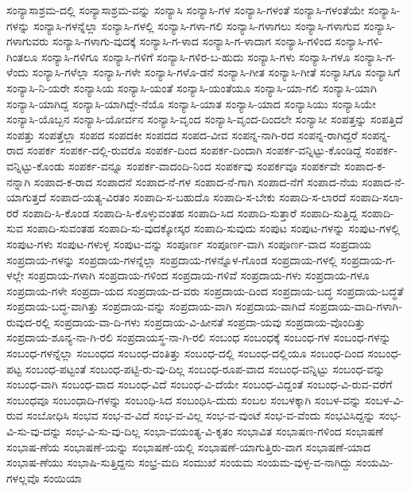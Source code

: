 {ಸಂನ್ಯಾಸಾಶ್ರಮ-ದಲ್ಲಿ
ಸಂನ್ಯಾಸಾಶ್ರಮ-ವನ್ನು
ಸಂನ್ಯಾಸಿ
ಸಂನ್ಯಾಸಿ-ಗಳ
ಸಂನ್ಯಾಸಿ-ಗಳಂತೆ
ಸಂನ್ಯಾಸಿ-ಗಳಂತೆಯೇ
ಸಂನ್ಯಾಸಿ-ಗಳನ್ನು
ಸಂನ್ಯಾಸಿ-ಗಳನ್ನೆಲ್ಲಾ
ಸಂನ್ಯಾಸಿ-ಗಳಲ್ಲಿ
ಸಂನ್ಯಾಸಿ-ಗಳಾ-ಗಲಿ
ಸಂನ್ಯಾಸಿ-ಗಳಾಗಲು
ಸಂನ್ಯಾಸಿ-ಗಳಾಗುವ
ಸಂನ್ಯಾಸಿ-ಗಳಾಗುವರು
ಸಂನ್ಯಾಸಿ-ಗಳಾಗು-ವುದಕ್ಕೆ
ಸಂನ್ಯಾಸಿ-ಗ-ಳಾದ
ಸಂನ್ಯಾಸಿ-ಗ-ಳಾದಾಗ
ಸಂನ್ಯಾಸಿ-ಗಳಿಂದ
ಸಂನ್ಯಾಸಿ-ಗಳಿ-ಗಿಂತಲೂ
ಸಂನ್ಯಾಸಿ-ಗಳಿಗೂ
ಸಂನ್ಯಾಸಿ-ಗಳಿಗೆ
ಸಂನ್ಯಾಸಿ-ಗಳಿರ-ಬ-ಹುದು
ಸಂನ್ಯಾಸಿ-ಗಳು
ಸಂನ್ಯಾಸಿ-ಗಳೂ
ಸಂನ್ಯಾಸಿ-ಗ-ಳೆಂದು
ಸಂನ್ಯಾಸಿ-ಗಳೆಲ್ಲಾ
ಸಂನ್ಯಾಸಿ-ಗಳೇ
ಸಂನ್ಯಾಸಿ-ಗಳೊ-ಡನೆ
ಸಂನ್ಯಾಸಿ-ಗೀತ
ಸಂನ್ಯಾಸಿ-ಗೀತೆ
ಸಂನ್ಯಾಸಿಗೂ
ಸಂನ್ಯಾಸಿಗೆ
ಸಂನ್ಯಾಸಿ-ನಿ-ಯರೇ
ಸಂನ್ಯಾಸಿಯ
ಸಂನ್ಯಾಸಿ-ಯಂತೆ
ಸಂನ್ಯಾಸಿ-ಯಂತೆಯೂ
ಸಂನ್ಯಾಸಿ-ಯಾ-ಗಲಿ
ಸಂನ್ಯಾಸಿ-ಯಾಗಿ
ಸಂನ್ಯಾಸಿ-ಯಾಗಿದ್ದ
ಸಂನ್ಯಾಸಿ-ಯಾಗಿದ್ದೇ-ನೆಯೊ
ಸಂನ್ಯಾಸಿ-ಯಾತ
ಸಂನ್ಯಾಸಿ-ಯಾದ
ಸಂನ್ಯಾಸಿಯು
ಸಂನ್ಯಾಸಿಯೇ
ಸಂನ್ಯಾಸಿ-ಯೊಬ್ಬನ
ಸಂನ್ಯಾಸಿ-ಯೋರ್ವನ
ಸಂನ್ಯಾಸಿ-ವೃಂದ
ಸಂನ್ಯಾಸಿ-ವೃಂದ-ದಿಂದಲೇ
ಸಂನ್ಯಾಸೀ
ಸಂಪತ್ತನ್ನು
ಸಂಪತ್ತಿದೆ
ಸಂಪತ್ತು
ಸಂಪತ್ತೆಲ್ಲಾ
ಸಂಪದ
ಸಂಪದಕೀ
ಸಂಪದದ
ಸಂಪದ-ವೀವ
ಸಂಪನ್ನ-ನಾಗಿ-ರದ
ಸಂಪನ್ನ-ರಾಗಿದ್ದರೆ
ಸಂಪನ್ನ-ರಾದ
ಸಂಪರ್ಕ
ಸಂಪರ್ಕ-ದಲ್ಲಿ-ರುವರೊ
ಸಂಪರ್ಕ-ದಿಂದ
ಸಂಪರ್ಕ-ದಿಂದಾಗಿ
ಸಂಪರ್ಕ-ವನ್ನಿಟ್ಟು-ಕೊಂಡಿದ್ದೆ
ಸಂಪರ್ಕ-ವನ್ನಿಟ್ಟು-ಕೊಂಡು
ಸಂಪರ್ಕ-ವನ್ನೂ
ಸಂಪರ್ಕ-ವಾದಂದಿ-ನಿಂದ
ಸಂಪರ್ಕವು
ಸಂಪರ್ಕವೂ
ಸಂಪರ್ಕವೇ
ಸಂಪಾದ-ಕ-ನನ್ನಾಗಿ
ಸಂಪಾದ-ಕ-ರಾದ
ಸಂಪಾದನೆ
ಸಂಪಾದ-ನೆ-ಗಳ
ಸಂಪಾದ-ನೆ-ಗಾಗಿ
ಸಂಪಾದ-ನೆಗೆ
ಸಂಪಾದ-ನೆಯ
ಸಂಪಾದ-ನೆ-ಯಾಗುತ್ತದೆ
ಸಂಪಾದ-ಯತ್ಯ-ವಿರತಂ
ಸಂಪಾದಿ-ಸ-ಬಹುದೊ
ಸಂಪಾದಿ-ಸ-ಬೇಕು
ಸಂಪಾದಿ-ಸ-ಲಾರದೆ
ಸಂಪಾದಿ-ಸಲಾ-ರರೆ
ಸಂಪಾದಿ-ಸಿ-ಕೊಂಡ
ಸಂಪಾದಿ-ಸಿ-ಕೊಳ್ಳುವಂತಹ
ಸಂಪಾದಿ-ಸಿದ
ಸಂಪಾದಿ-ಸುತ್ತಾರೆ
ಸಂಪಾದಿ-ಸುತ್ತಿದ್ದ
ಸಂಪಾದಿ-ಸುವ
ಸಂಪಾದಿ-ಸುವಂತಹ
ಸಂಪಾದಿ-ಸು-ವುದಕ್ಕೋಸ್ಕರ
ಸಂಪಾದಿ-ಸುವುದು
ಸಂಪುಟ
ಸಂಪುಟ-ಗಳನ್ನು
ಸಂಪುಟ-ಗಳಲ್ಲಿ
ಸಂಪುಟ-ಗಳು
ಸಂಪುಟ-ಗಳುಳ್ಳ
ಸಂಪುಟ-ವನ್ನು
ಸಂಪೂರ್ಣ
ಸಂಪೂರ್ಣ-ವಾಗಿ
ಸಂಪೂರ್ಣ-ವಾದ
ಸಂಪ್ರದಾಯ
ಸಂಪ್ರದಾಯ-ಗಳನ್ನು
ಸಂಪ್ರದಾಯ-ಗಳನ್ನೆಲ್ಲಾ
ಸಂಪ್ರದಾಯ-ಗಳನ್ನೊಳ-ಗೊಂಡ
ಸಂಪ್ರದಾಯ-ಗಳಲ್ಲಿ
ಸಂಪ್ರದಾಯ-ಗ-ಳಲ್ಲೇ
ಸಂಪ್ರದಾಯ-ಗಳಾಗಿ
ಸಂಪ್ರದಾಯ-ಗಳಿಂದ
ಸಂಪ್ರದಾಯ-ಗಳಿವೆ
ಸಂಪ್ರದಾಯ-ಗಳು
ಸಂಪ್ರದಾಯ-ಗಳೂ
ಸಂಪ್ರದಾಯ-ಗಳೇ
ಸಂಪ್ರದಾ-ಯದ
ಸಂಪ್ರದಾಯ-ದ-ವರು
ಸಂಪ್ರದಾಯ-ದಿಂದ
ಸಂಪ್ರದಾಯ-ಬದ್ಧ
ಸಂಪ್ರದಾಯ-ಬದ್ಧತೆ
ಸಂಪ್ರದಾಯ-ಬದ್ಧ-ವಾಗಿತ್ತು
ಸಂಪ್ರದಾಯ-ವನ್ನು
ಸಂಪ್ರದಾಯ-ವಾಗಿ
ಸಂಪ್ರದಾಯ-ವಾಗಿದೆ
ಸಂಪ್ರದಾಯ-ವಾದಿ-ಗಳಾಗಿ-ರುವುದ-ರಲ್ಲಿ
ಸಂಪ್ರದಾಯ-ವಾ-ದಿ-ಗಳು
ಸಂಪ್ರದಾಯ-ವಿ-ಹೀನತೆ
ಸಂಪ್ರದಾ-ಯವು
ಸಂಪ್ರದಾಯ-ವೊಂದಿತ್ತು
ಸಂಪ್ರದಾಯ-ಶೂನ್ಯ-ನಾ-ಗಿ-ರಲಿ
ಸಂಪ್ರದಾಯಸ್ಥ-ನಾ-ಗಿ-ರಲಿ
ಸಂಬಂಧ
ಸಂಬಂಧಕ್ಕೆ
ಸಂಬಂಧ-ಗಳ
ಸಂಬಂಧ-ಗಳನ್ನು
ಸಂಬಂಧ-ಗಳನ್ನೆಲ್ಲಾ
ಸಂಬಂಧದ
ಸಂಬಂಧ-ದಂತಿತ್ತು
ಸಂಬಂಧ-ದಲ್ಲಿ
ಸಂಬಂಧ-ದಲ್ಲಿಯೂ
ಸಂಬಂಧ-ದಿಂದ
ಸಂಬಂಧ-ಪಟ್ಟ
ಸಂಬಂಧ-ಪಟ್ಟಂತೆ
ಸಂಬಂಧ-ಪಟ್ಟಿ-ರು-ವು-ದಿಲ್ಲ
ಸಂಬಂಧ-ರೂಪ-ವಾದ
ಸಂಬಂಧ-ವನ್ನಿಟ್ಟು
ಸಂಬಂಧ-ವನ್ನು
ಸಂಬಂಧ-ವಾಗಿ
ಸಂಬಂಧ-ವಾದ
ಸಂಬಂಧ-ವಿದೆ
ಸಂಬಂಧ-ವಿ-ದೆಯೇ
ಸಂಬಂಧ-ವಿದ್ದಂತೆ
ಸಂಬಂಧ-ವಿ-ರುವ-ವರೆಗೆ
ಸಂಬಂಧವೂ
ಸಂಬಂಧಾದಿ-ಗಳನ್ನು
ಸಂಬಂಧಿ-ಸಿದ
ಸಂಬಂಧಿಸಿ-ದುದು
ಸಂಬಲ
ಸಂಬಳಕ್ಕಾಗಿ
ಸಂಬಳ-ವನ್ನು
ಸಂಬಳ-ವಿ-ರುವ
ಸಂಬೋಧಿಸಿ
ಸಂಭವ
ಸಂಭ-ವ-ವಿದೆ
ಸಂಭ-ವ-ವಿಲ್ಲ
ಸಂಭ-ವ-ವುಂಟೆ
ಸಂಭ-ವ-ವೆಂದು
ಸಂಭವಿಸಿದ್ದನ್ನು
ಸಂಭ-ವಿ-ಸು-ವು-ದನ್ನು
ಸಂಭ-ವಿ-ಸು-ವು-ದಿಲ್ಲ
ಸಂಭಾ-ವಯಂತ್ಯ-ವಿ-ಕೃತಂ
ಸಂಭಾವಿತ
ಸಂಭಾಷಣ-ಗಳಿಂದ
ಸಂಭಾಷಣೆ
ಸಂಭಾಷ-ಣೆಯ
ಸಂಭಾಷಣೆ-ಯನ್ನು
ಸಂಭಾಷಣೆ-ಯಲ್ಲಿ
ಸಂಭಾಷಣೆ-ಯಾಗುತ್ತಿರು-ವಾಗ
ಸಂಭಾಷಣೆ-ಯಾದ
ಸಂಭಾಷ-ಣೆಯು
ಸಂಭಾಷಿ-ಸುತ್ತಿದ್ದನು
ಸಂಭ್ರ-ಮದಿ
ಸಂಮುಖೆ
ಸಂಯಮ
ಸಂಯಮ-ವುಳ್ಳ-ವ-ನಾಗಿದ್ದು
ಸಂಯಮಿ-ಗಳಲ್ಲವೊ
ಸಂಯಿಯಾ
}
